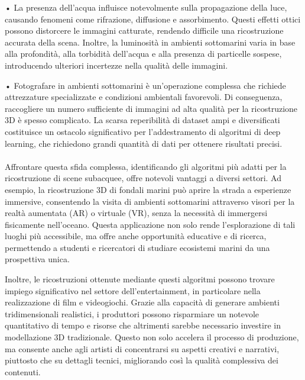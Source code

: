 	•	La presenza dell’acqua influisce notevolmente sulla propagazione della luce, causando fenomeni come rifrazione, diffusione e assorbimento. Questi effetti ottici possono distorcere le immagini catturate, rendendo difficile una ricostruzione accurata della scena. Inoltre, la luminosità in ambienti sottomarini varia in base alla profondità, alla torbidità dell’acqua e alla presenza di particelle sospese, introducendo ulteriori incertezze nella qualità delle immagini.
 
	•	Fotografare in ambienti sottomarini è un’operazione complessa che richiede attrezzature specializzate e condizioni ambientali favorevoli. Di conseguenza, raccogliere un numero sufficiente di immagini ad alta qualità per la ricostruzione 3D è spesso complicato. La scarsa reperibilità di dataset ampi e diversificati costituisce un ostacolo significativo per l’addestramento di algoritmi di deep learning, che richiedono grandi quantità di dati per ottenere risultati precisi.
\\\\
 Affrontare questa sfida complessa, identificando gli algoritmi più adatti per la ricostruzione di scene subacquee, offre notevoli vantaggi a diversi settori. Ad esempio, la ricostruzione 3D di fondali marini può aprire la strada a esperienze immersive, consentendo la visita di ambienti sottomarini attraverso visori per la realtà aumentata (AR) o virtuale (VR), senza la necessità di immergersi fisicamente nell’oceano. Questa applicazione non solo rende l’esplorazione di tali luoghi più accessibile, ma offre anche opportunità educative e di ricerca, permettendo a studenti e ricercatori di studiare ecosistemi marini da una prospettiva unica.

Inoltre, le ricostruzioni ottenute mediante questi algoritmi possono trovare impiego significativo nel settore dell’entertainment, in particolare nella realizzazione di film e videogiochi. Grazie alla capacità di generare ambienti tridimensionali realistici, i produttori possono risparmiare un notevole quantitativo di tempo e risorse che altrimenti sarebbe necessario investire in modellazione 3D tradizionale. Questo non solo accelera il processo di produzione, ma consente anche agli artisti di concentrarsi su aspetti creativi e narrativi, piuttosto che su dettagli tecnici, migliorando così la qualità complessiva dei contenuti.